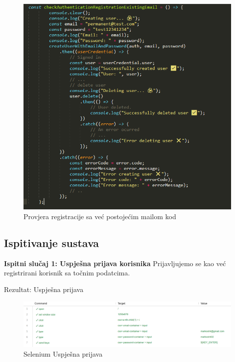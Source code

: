             \begin{figure}[H]
			\includegraphics[scale=0.8]{slike/reg sa postojecim mailom kod.png}
			\centering
			\caption{Provjera registracije sa već postojećim mailom kod}
			\label{fig:promjene}
		          \end{figure}
			
			
			
			\subsection{Ispitivanje sustava}



    \textbf{Ispitni slučaj 1: Uspješna prijava korisnika}
    Prijavljujemo se kao već registrirani korisnik sa točnim podatcima. 
    
    Rezultat: Uspješna prijava

    \begin{figure}[H]
			\includegraphics[scale=0.5]{slike/UspjesnaPrijava1.png}
			\centering
			\caption{Selenium Uspješna prijava}
			\label{fig:promjene}
		          \end{figure}


